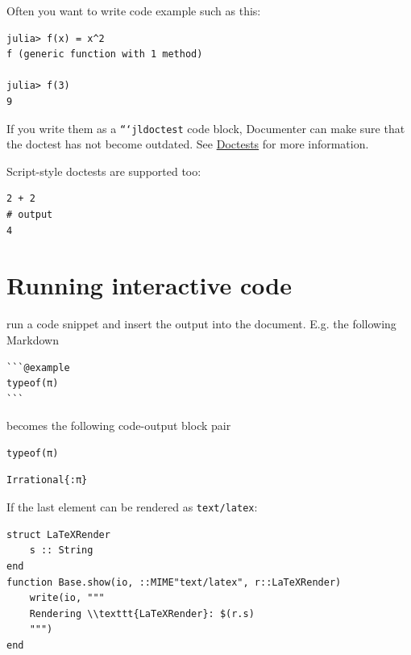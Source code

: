 Often you want to write code example such as this:




\begin{verbatim}
julia> f(x) = x^2
f (generic function with 1 method)

julia> f(3)
9
\end{verbatim}



If you write them as a \texttt{```jldoctest} code block, Documenter can make sure that the doctest has not become outdated. See \href{@ref}{Doctests} for more information.



Script-style doctests are supported too:




\begin{verbatim}
2 + 2
# output
4
\end{verbatim}



\section{Running interactive code}



\label{2084637983845057887}{}


 run a code snippet and insert the output into the document.
E.g. the following Markdown




\begin{verbatim}
```@example
typeof(π)
```
\end{verbatim}



becomes the following code-output block pair




\begin{verbatim}
typeof(π)
\end{verbatim}


\begin{verbatim}
Irrational{:π}
\end{verbatim}



If the last element can be rendered as \texttt{text/latex}:




\begin{verbatim}
struct LaTeXRender
    s :: String
end
function Base.show(io, ::MIME"text/latex", r::LaTeXRender)
    write(io, """
    Rendering \\texttt{LaTeXRender}: $(r.s)
    """)
end
\end{verbatim}




